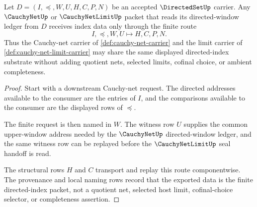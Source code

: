 \begin{theorem}
\label{thm:directed-set-cauchynet-index-handoff}
Let $D=(I,\preceq,W,U,H,C,P,N)$ be an accepted $\DirectedSetUp$ carrier. Any $\CauchyNetUp$ or $\CauchyNetLimitUp$ packet that reads its directed-window ledger from $D$ receives index data only through the finite route
$$
I,\preceq,W,U \longmapsto H,C,P,N .
$$
Thus the Cauchy-net carrier of \autoref{def:cauchy-net-carrier} and the limit carrier of \autoref{def:cauchy-net-limit-carrier} may share the same displayed directed-index substrate without adding quotient nets, selected limits, cofinal choice, or ambient completeness.
\end{theorem}
\begin{proof}
Start with a downstream Cauchy-net request. The directed addresses available to the consumer are the entries of $I$, and the comparisons available to the consumer are the displayed rows of $\preceq$.

The finite request is then named in $W$. The witness row $U$ supplies the common upper-window address needed by the $\CauchyNetUp$ directed-window ledger, and the same witness row can be replayed before the $\CauchyNetLimitUp$ seal handoff is read.

The structural rows $H$ and $C$ transport and replay this route componentwise. The provenance and local naming rows record that the exported data is the finite directed-index packet, not a quotient net, selected host limit, cofinal-choice selector, or completeness assertion.
\end{proof}

